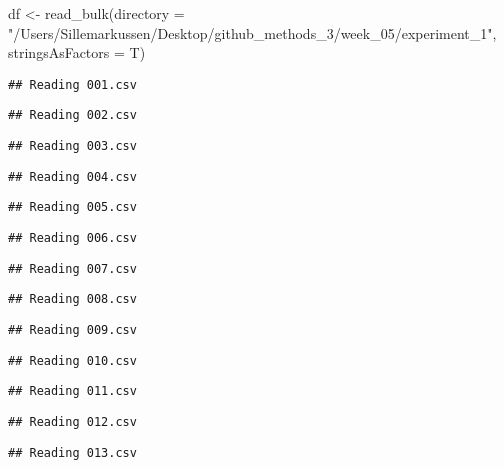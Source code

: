 \documentclass[
]{article}
\newenvironment{Shaded}{\begin{snugshade}}{\end{snugshade}}
\newcommand{\AttributeTok}[1]{\textcolor[rgb]{0.77,0.63,0.00}{#1}}
\newcommand{\FunctionTok}[1]{\textcolor[rgb]{0.00,0.00,0.00}{#1}}
\newcommand{\NormalTok}[1]{#1}
\newcommand{\OtherTok}[1]{\textcolor[rgb]{0.56,0.35,0.01}{#1}}
\newcommand{\StringTok}[1]{\textcolor[rgb]{0.31,0.60,0.02}{#1}}
\begin{document}
\begin{Shaded}
\begin{Highlighting}[]
\NormalTok{df }\OtherTok{\textless{}{-}} \FunctionTok{read\_bulk}\NormalTok{(}\AttributeTok{directory =} \StringTok{"/Users/Sillemarkussen/Desktop/github\_methods\_3/week\_05/experiment\_1"}\NormalTok{, }\AttributeTok{stringsAsFactors =}\NormalTok{ T)}
\end{Highlighting}
\end{Shaded}

\begin{verbatim}
## Reading 001.csv
\end{verbatim}

\begin{verbatim}
## Reading 002.csv
\end{verbatim}

\begin{verbatim}
## Reading 003.csv
\end{verbatim}

\begin{verbatim}
## Reading 004.csv
\end{verbatim}

\begin{verbatim}
## Reading 005.csv
\end{verbatim}

\begin{verbatim}
## Reading 006.csv
\end{verbatim}

\begin{verbatim}
## Reading 007.csv
\end{verbatim}

\begin{verbatim}
## Reading 008.csv
\end{verbatim}

\begin{verbatim}
## Reading 009.csv
\end{verbatim}

\begin{verbatim}
## Reading 010.csv
\end{verbatim}

\begin{verbatim}
## Reading 011.csv
\end{verbatim}

\begin{verbatim}
## Reading 012.csv
\end{verbatim}

\begin{verbatim}
## Reading 013.csv
\end{verbatim}
\end{document}
